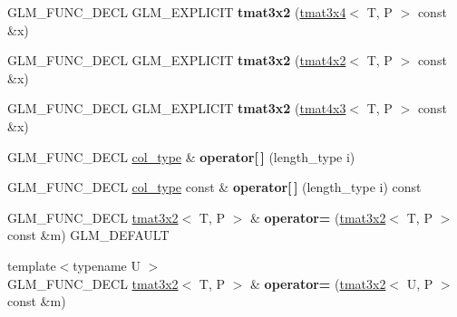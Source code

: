 \begin{DoxyCompactItemize}
\item 
\mbox{\label{structglm_1_1tmat3x2_af2e7c96eb468f302bc3b90dbc41e62d7}} 
G\+L\+M\+\_\+\+F\+U\+N\+C\+\_\+\+D\+E\+CL G\+L\+M\+\_\+\+E\+X\+P\+L\+I\+C\+IT {\bfseries tmat3x2} (\hyperlink{structglm_1_1tmat3x4}{tmat3x4}$<$ T, P $>$ const \&x)
\item 
\mbox{\label{structglm_1_1tmat3x2_aa157cfdb7cf64c70765e4421dac9e4c1}} 
G\+L\+M\+\_\+\+F\+U\+N\+C\+\_\+\+D\+E\+CL G\+L\+M\+\_\+\+E\+X\+P\+L\+I\+C\+IT {\bfseries tmat3x2} (\hyperlink{structglm_1_1tmat4x2}{tmat4x2}$<$ T, P $>$ const \&x)
\item 
\mbox{\label{structglm_1_1tmat3x2_ac101d14687670dd6916a9e5c161efdf1}} 
G\+L\+M\+\_\+\+F\+U\+N\+C\+\_\+\+D\+E\+CL G\+L\+M\+\_\+\+E\+X\+P\+L\+I\+C\+IT {\bfseries tmat3x2} (\hyperlink{structglm_1_1tmat4x3}{tmat4x3}$<$ T, P $>$ const \&x)
\item 
\mbox{\label{structglm_1_1tmat3x2_a7bf6dec8837ea7b18163629c1fdf60bb}} 
G\+L\+M\+\_\+\+F\+U\+N\+C\+\_\+\+D\+E\+CL \hyperlink{structglm_1_1tvec2}{col\+\_\+type} \& {\bfseries operator\mbox{[}$\,$\mbox{]}} (length\+\_\+type i)
\item 
\mbox{\label{structglm_1_1tmat3x2_a870e0f36a2588eb7e739aa52a2302279}} 
G\+L\+M\+\_\+\+F\+U\+N\+C\+\_\+\+D\+E\+CL \hyperlink{structglm_1_1tvec2}{col\+\_\+type} const  \& {\bfseries operator\mbox{[}$\,$\mbox{]}} (length\+\_\+type i) const
\item 
\mbox{\label{structglm_1_1tmat3x2_ad3e07207fa54ffc24aad6151ab116af8}} 
G\+L\+M\+\_\+\+F\+U\+N\+C\+\_\+\+D\+E\+CL \hyperlink{structglm_1_1tmat3x2}{tmat3x2}$<$ T, P $>$ \& {\bfseries operator=} (\hyperlink{structglm_1_1tmat3x2}{tmat3x2}$<$ T, P $>$ const \&m) G\+L\+M\+\_\+\+D\+E\+F\+A\+U\+LT
\item 
\mbox{\label{structglm_1_1tmat3x2_a5d7234f313530abc1c77413d15fa6882}} 
{\footnotesize template$<$typename U $>$ }\\G\+L\+M\+\_\+\+F\+U\+N\+C\+\_\+\+D\+E\+CL \hyperlink{structglm_1_1tmat3x2}{tmat3x2}$<$ T, P $>$ \& {\bfseries operator=} (\hyperlink{structglm_1_1tmat3x2}{tmat3x2}$<$ U, P $>$ const \&m)

\end{DoxyCompactItemize}
